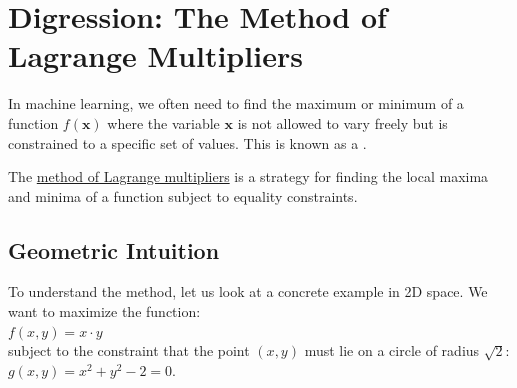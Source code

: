 \FloatBarrier

\vspace*{\fill}
\pagebreak


\section{Digression: The Method of Lagrange Multipliers}
\label{section:lagrange-multipliers}

In machine learning, we often need to find the maximum or minimum of a function $f(\mathbf{x})$ where the variable $\mathbf{x}$ is not allowed to vary freely but is constrained to a specific set of values. This is known as a .

The \href{https://en.wikipedia.org/wiki/Lagrange_multiplier}{method of Lagrange multipliers} is a strategy for finding the local maxima and minima of a function subject to equality constraints.

\subsection{Geometric Intuition}
To understand the method, let us look at a concrete example in 2D space.
We want to maximize the function:
\\[0.2cm]
\hspace*{1.3cm}
$f(x, y) = x \cdot y$
\\[0.2cm]
subject to the constraint that the point $(x, y)$ must lie on a circle of radius $\sqrt{2}$:
\\[0.2cm]
\hspace*{1.3cm}
$g(x, y) = x^2 + y^2 - 2 = 0$.

